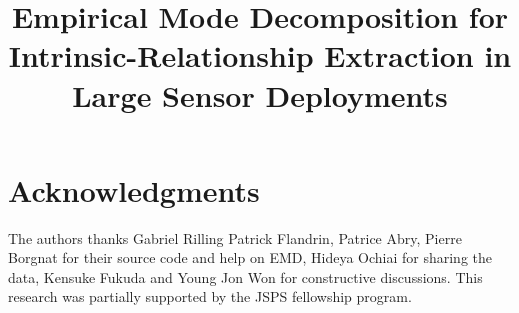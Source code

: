 \documentclass[conference]{IEEEtran}
\begin{document}
\title{Empirical Mode Decomposition for Intrinsic-Relationship Extraction in Large Sensor Deployments}


\author{
\and
{}
\and
{}
}


\maketitle

% 
% 










\section*{Acknowledgments}
The authors thanks Gabriel Rilling Patrick Flandrin, Patrice Abry, Pierre Borgnat for their source code and help on EMD, Hideya Ochiai for sharing the data, Kensuke Fukuda and Young Jon Won for constructive discussions.
This research was partially supported by the JSPS fellowship program.



\end{document}
